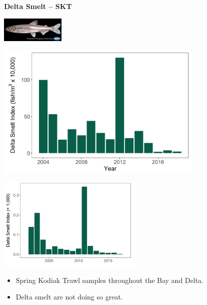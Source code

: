 \documentclass[]{article}\usepackage[]{graphicx}\usepackage[]{color}
\begin{document}
\begin{Row}
  \begin{Cell}{7}
    \begin{center}
      {\bf {\large Delta Smelt – SKT}}
    \end{center}
  \end{Cell}
  \begin{Cell}{6}
    \begin{center}
      \includegraphics[align=m]{figures/smelt/photo_delta_smelt.png}
    \end{center}
  \end{Cell}
\end{Row}

\begin{Row}
  \begin{Cell}{7}
    \begin{center}
      \includegraphics[width=10cm,align=m]{figures/smelt/skt_dsm_fig.png}
    \end{center}
  \end{Cell}
  \begin{Cell}{6}
    \begin{center}
      \vspace{-3cm}
      \includegraphics[width=7cm,align=m]{figures/smelt/delta_smelt_tmp_2.png}
      \begin{itemize}[leftmargin=*]
        \item Spring Kodiak Trawl samples throughout the Bay and Delta.
        \item Delta smelt are not doing so great.
      \end{itemize}
    \end{center}
  \end{Cell}
\end{Row}
\end{document}
